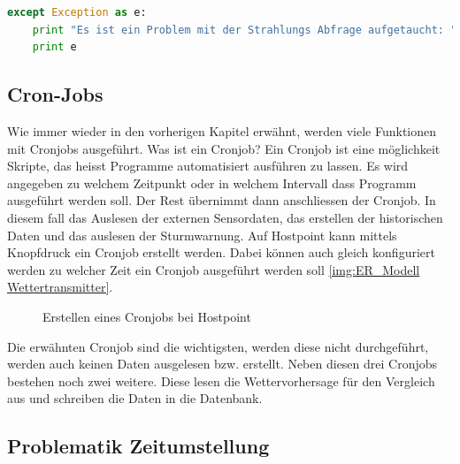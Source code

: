 \begin{lstlisting}[label=lst:printfunction,caption=Beispiel für print Funktion, language=Python, style=py]
except Exception as e:
    print "Es ist ein Problem mit der Strahlungs Abfrage aufgetaucht: "
    print e
\end{lstlisting}

\subsection{Cron-Jobs}
Wie immer wieder in den vorherigen Kapitel erwähnt, werden viele Funktionen mit Cronjobs ausgeführt. Was ist ein Cronjob? Ein Cronjob ist eine möglichkeit Skripte, das heisst Programme automatisiert ausführen zu lassen. Es wird angegeben zu welchem Zeitpunkt oder in welchem Intervall dass Programm ausgeführt werden soll. Der Rest übernimmt dann anschliessen der Cronjob. In diesem fall das Auslesen der externen Sensordaten, das erstellen der historischen Daten und das auslesen der Sturmwarnung. Auf Hostpoint kann mittels Knopfdruck ein Cronjob erstellt werden. Dabei können auch gleich konfiguriert werden zu welcher Zeit ein Cronjob ausgeführt werden soll \ref{img:ER_Modell Wettertransmitter}.

\begin{figure}[h!]
	\centering
	\caption{Erstellen eines Cronjobs bei Hostpoint}
	\label{img:Cronjob}
\end{figure}
\newline

Die erwähnten Cronjob sind die wichtigsten, werden diese nicht durchgeführt, werden auch keinen Daten ausgelesen bzw. erstellt. Neben diesen drei Cronjobs bestehen noch zwei weitere. Diese lesen die Wettervorhersage für den Vergleich aus und schreiben die Daten in die Datenbank.

\subsection{Problematik Zeitumstellung}

\newline
